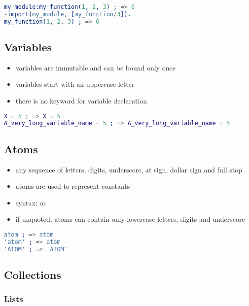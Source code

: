 \documentclass[a4paper,landscape,10pt]{article}
\begin{document}
\begin{multicols*}{2}
  \begin{lstlisting}[language=Erlang]
my_module:my_function(1, 2, 3) ; => 6
-import(my_module, [my_function/3]).
my_function(1, 2, 3) ; => 6
\end{lstlisting}

  \subsection{Variables}

  \begin{itemize}
    \item variables are immutable and can be bound only once
    \item variables start with an uppercase letter
    \item there is no keyword for variable declaration
  \end{itemize}

  \begin{lstlisting}[language=Erlang]
X = 5 ; => X = 5
A_very_long_variable_name = 5 ; => A_very_long_variable_name = 5
  \end{lstlisting}

  \subsection{Atoms}

  \begin{itemize}
    \item any sequence of letters, digits, underscore, at sign, dollar sign and full stop
    \item atoms are used to represent constants
    \item syntax:  or 
    \item if unquoted, atoms can contain only lowercase letters, digits and underscore
  \end{itemize}

  \begin{lstlisting}[language=Erlang]
atom ; => atom
'atom' ; => atom
'ATOM' ; => 'ATOM'
\end{lstlisting}

  \subsection{Collections}

  \subsubsection{Lists}


\end{multicols*}
\end{document}
